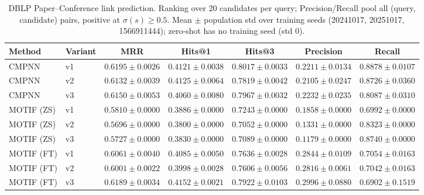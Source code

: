 \documentclass{article}
\begin{document}
\begin{table}[t]
\centering
\small
\begin{tabular}{||l||l||c|c|c||c|c||}
\hline
\textbf{Method} & \textbf{Variant} & \textbf{MRR} & \textbf{Hits@1} & \textbf{Hits@3} & \textbf{Precision} & \textbf{Recall} \\
\hline\hline
CMPNN & v1 & $0.6195 \pm 0.0026$ & $0.4121 \pm 0.0038$ & $0.8017 \pm 0.0033$ & $0.2211 \pm 0.0134$ & $0.8878 \pm 0.0107$ \\
\hline
CMPNN & v2 & $0.6132 \pm 0.0039$ & $0.4125 \pm 0.0064$ & $0.7819 \pm 0.0042$ & $0.2105 \pm 0.0247$ & $0.8726 \pm 0.0360$ \\
\hline
CMPNN & v3 & $0.6150 \pm 0.0053$ & $0.4060 \pm 0.0080$ & $0.7967 \pm 0.0032$ & $0.2232 \pm 0.0235$ & $0.8087 \pm 0.0310$ \\
\hline
\hline
MOTIF (ZS) & v1 & $0.5810 \pm 0.0000$ & $0.3886 \pm 0.0000$ & $0.7243 \pm 0.0000$ & $0.1858 \pm 0.0000$ & $0.6992 \pm 0.0000$ \\
\hline
MOTIF (ZS) & v2 & $0.5696 \pm 0.0000$ & $0.3800 \pm 0.0000$ & $0.7052 \pm 0.0000$ & $0.1331 \pm 0.0000$ & $0.8323 \pm 0.0000$ \\
\hline
MOTIF (ZS) & v3 & $0.5727 \pm 0.0000$ & $0.3830 \pm 0.0000$ & $0.7089 \pm 0.0000$ & $0.1179 \pm 0.0000$ & $0.8740 \pm 0.0000$ \\
\hline
\hline
MOTIF (FT) & v1 & $0.6061 \pm 0.0040$ & $0.4085 \pm 0.0050$ & $0.7636 \pm 0.0028$ & $0.2844 \pm 0.0109$ & $0.7054 \pm 0.0163$ \\
\hline
MOTIF (FT) & v2 & $0.6001 \pm 0.0022$ & $0.3998 \pm 0.0028$ & $0.7606 \pm 0.0056$ & $0.2816 \pm 0.0061$ & $0.7042 \pm 0.0163$ \\
\hline
MOTIF (FT) & v3 & $0.6189 \pm 0.0034$ & $0.4152 \pm 0.0021$ & $0.7922 \pm 0.0103$ & $0.2996 \pm 0.0880$ & $0.6902 \pm 0.1519$ \\
\hline
\end{tabular}
\caption{DBLP Paper--Conference link prediction. Ranking over 20 candidates per query; Precision/Recall pool all (query, candidate) pairs, positive at $\sigma(s) \geq 0.5$. Mean $\pm$ population std over training seeds (20241017, 20251017, 1566911444); zero-shot has no training seed (std 0). }
\label{tab:dblp_paper_conference_seed_performance}
\end{table}
\end{document}
